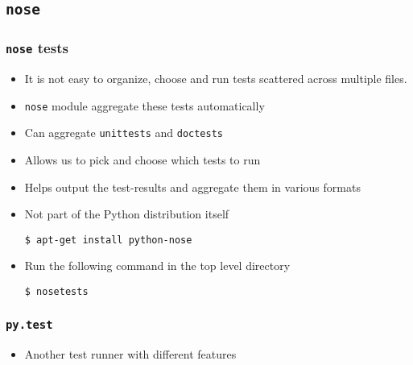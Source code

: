 \documentclass[12pt,presentation]{beamer}
\begin{document}
\subsection{\texttt{nose}}

\begin{frame}[fragile]
  \frametitle{\texttt{nose} tests}
  \begin{itemize}
  \item It is not easy to organize, choose and run tests scattered
    across multiple files.
  \item \texttt{nose} module aggregate these tests automatically
  \item Can aggregate \texttt{unittests} and \texttt{doctests}
  \item Allows us to pick and choose which tests to run
  \item Helps output the test-results and aggregate them in various
    formats
  \item Not part of the Python distribution itself
\begin{lstlisting}
$ apt-get install python-nose
\end{lstlisting} %
  \item Run the following command in the top level directory
\begin{lstlisting}
$ nosetests
\end{lstlisting} %
  \end{itemize}
\end{frame}


\begin{frame}
  \frametitle{\texttt{py.test}}
  \begin{itemize}
  \item Another test runner with different features
  \end{itemize}
\end{frame}
\end{document}
